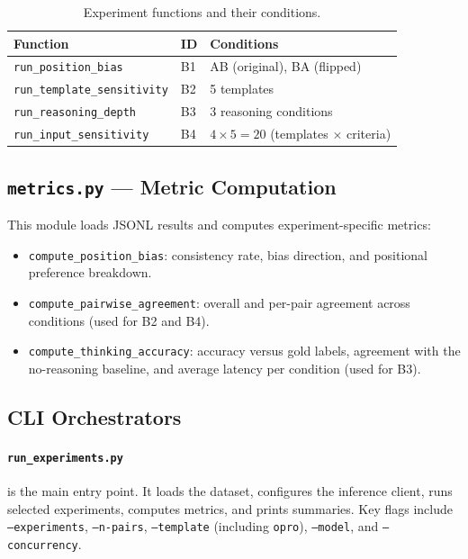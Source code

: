 \documentclass[11pt,a4paper]{article}
\begin{document}
\begin{table}[htbp]
\centering
\small
\caption{Experiment functions and their conditions.}
\label{tab:experiments}
\begin{tabular}{@{}llp{6.5cm}@{}}
  \toprule
  \textbf{Function} & \textbf{ID} & \textbf{Conditions} \\
  \midrule
  \texttt{run\_position\_bias} & B1 & AB (original), BA (flipped) \\
  \texttt{run\_template\_sensitivity} & B2 & 5 templates \\
  \texttt{run\_reasoning\_depth} & B3 & 3 reasoning conditions \\
  \texttt{run\_input\_sensitivity} & B4 & $4 \times 5 = 20$ (templates $\times$ criteria) \\
  \bottomrule
\end{tabular}
\end{table}


\subsection{\texttt{metrics.py} --- Metric Computation}

This module loads JSONL results and computes experiment-specific metrics:
\begin{itemize}[nosep]
  \item \texttt{compute\_position\_bias}: consistency rate, bias direction,
        and positional preference breakdown.
  \item \texttt{compute\_pairwise\_agreement}: overall and per-pair agreement
        across conditions (used for B2 and B4).
  \item \texttt{compute\_thinking\_accuracy}: accuracy versus gold labels,
        agreement with the no-reasoning baseline, and average latency per
        condition (used for B3).
\end{itemize}


\subsection{CLI Orchestrators}

\paragraph{\texttt{run\_experiments.py}} is the main entry point. It loads
the dataset, configures the inference client, runs selected experiments,
computes metrics, and prints summaries. Key flags include
\texttt{--experiments}, \texttt{--n-pairs}, \texttt{--template} (including
\texttt{opro}), \texttt{--model}, and \texttt{--concurrency}.
\end{document}
